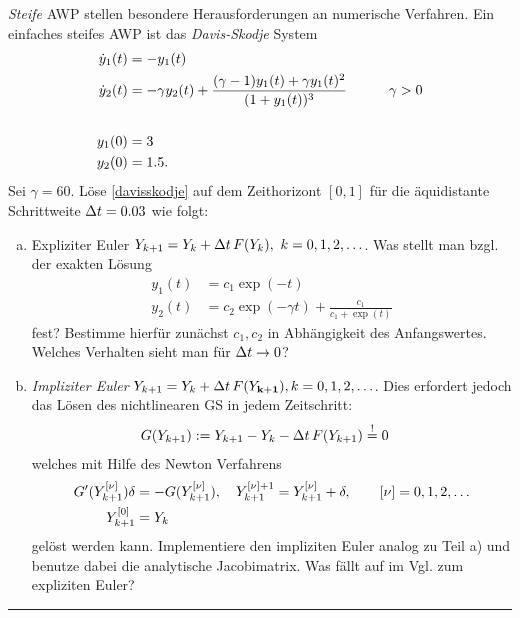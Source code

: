 \documentclass[11pt,a4paper]{article}
\begin{document}
\bigskip%

\begin{aufg}
\textit{Steife} AWP stellen besondere Herausforderungen an numerische Verfahren.
Ein einfaches steifes AWP ist das \emph{Davis-Skodje} System \begin{align} 
\label{davisskodje}
\dot{y}_1(t) &= -y_1(t) \notag\\
\dot{y}_2(t) &= -\gamma y_2(t) + \frac{(\gamma -1)y_1(t) + \gamma y_1(t)^2}{(1+y_1(t))^3} \qquad \quad \gamma > 0 \notag\\
& \\
y_1(0) &= 3 \notag\\
y_2(0) &= 1.5. \notag
\end{align}
Sei $\gamma = 60$. L\"ose \eqref{davisskodje} auf dem Zeithorizont $[0,1]$ f\"ur die \"aquidistante Schrittweite $\Delta t = 0.03$ wie folgt:
\begin{enumerate}[a)]
\item Expliziter Euler $Y_{k+1} = Y_k + \Delta t \,F(Y_k), \ k = 0,1,2,\ldots$.
Was stellt man bzgl. der exakten L\"osung \begin{align*} y_1(t) &= c_1 \exp(-t) \\ y_2(t) &= c_2\exp(-\gamma t) + \frac{c_1}{c_1 + \exp(t)}\end{align*} fest? Bestimme hierf\"ur zun\"achst $c_1, c_2$ in Abh\"angigkeit des Anfangswertes. Welches Verhalten sieht man f\"ur $\Delta t \rightarrow 0$?
\item \emph{Impliziter Euler} $Y_{k+1} = Y_k + \Delta t\, F(Y_{\mathbf{k+1}}), k = 0,1,2,\ldots$. Dies erfordert jedoch das L\"osen des nichtlinearen GS in jedem Zeitschritt: \begin{align*} G(Y_{k+1}) &:= Y_{k+1} - Y_k - \Delta t\, F(Y_{k+1}) \stackrel{!}{=} 0\end{align*} welches mit Hilfe des Newton Verfahrens \begin{align*} G'(Y_{k+1}^{[\nu]})\delta &= -G(Y_{k+1}^{[\nu]}), \quad Y_{k+1}^{[\nu]+1} = Y_{k+1}^{[\nu]} + \delta, \qquad [\nu] = 0,1,2,\ldots \\ Y_{k+1}^{[0]} &= Y_{k}\end{align*} gel\"ost werden kann. Implementiere den impliziten Euler analog zu Teil a) und benutze dabei die analytische Jacobimatrix. Was f\"allt auf im Vgl. zum expliziten Euler? 
\end{enumerate}
\end{aufg}


\bigskip
\hrule

\end{document}
